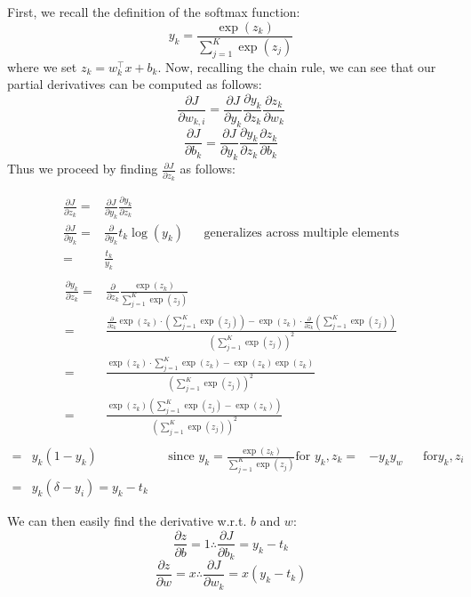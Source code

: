First, we recall the definition of the softmax function:
\[
  y_k = \frac{\exp(z_k)}{\sum^K_{j=1}\exp(z_j)}
\]
where we set $z_k=w^\top_kx+b_k$. Now, recalling the chain rule, we can see that our partial derivatives can be computed as follows:
\[
  \frac{\partial J}{\partial w_{k,i}} = \frac{\partial J}{\partial y_k} \frac{\partial y_k}{\partial z_k} \frac{\partial z_k}{\partial w_k}
\]
\[
  \frac{\partial J}{\partial b_k} = \frac{\partial J}{\partial y_k} \frac{\partial y_k}{\partial z_k} \frac{\partial z_k}{\partial b_k}
\]
Thus we proceed by finding $\frac{\partial J}{\partial z_k}$ as follows:

\begin{align*}
  \frac{\partial J}{\partial z_k} =& \frac{\partial J}{\partial y_k} \frac{\partial y_k}{\partial z_k} \\
  \frac{\partial J}{\partial y_k} =& \frac{\partial}{\partial y_k} t_k\log(y_k) && \text{generalizes across multiple elements} \\
  =& \frac{t_k}{y_k} \\
\end{align*}
\begin{align*}
  \frac{\partial y_k}{\partial z_k} =& \frac{\partial}{\partial z_k} \frac{\exp(z_k)}{\sum^K_{j=1}\exp(z_j)} \\
  =& \frac{\frac{\partial}{\partial z_k} \exp(z_k) \cdot \left(\sum^K_{j=1}\exp(z_j)\right) - \exp(z_k)\cdot\frac{\partial}{\partial z_k}\left(\sum^K_{j=1}\exp(z_j)\right)}{\left(\sum^K_{j=1}\exp(z_j)\right)^2} \\
  =& \frac{\exp(z_k)\cdot\sum^K_{j=1}\exp(z_k) - \exp(z_k)\exp(z_k)}{\left(\sum^K_{j=1}\exp(z_j)\right)^2} \\
  =& \frac{\exp(z_k)\left(\sum^K_{j=1}\exp(z_j)-\exp(z_k)\right)}{\left(\sum^K_{j=1}\exp(z_j)\right)^2} \\
\end{align*}
\begin{align*}
  =& y_k(1-y_k) && \text{since } y_k = \frac{\exp(z_k)}{\sum^K_{j=1}\exp(z_j)} \text{for } y_k, z_k 
  =& -y_ky_w &&\text{for} y_k, z_i \\
  =& y_k(\delta - y_i) = y_k-t_k
\end{align*}

We can then easily find the derivative w.r.t. $b$ and $w$: 
\[\frac{\partial z}{\partial b} = 1 \therefore \frac{\partial J}{\partial b_k} = y_k - t_k\]
\[\frac{\partial z}{\partial w} = x \therefore \frac{\partial J}{\partial w_k} = x(y_k - t_k)\]
